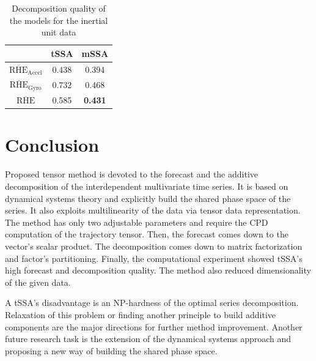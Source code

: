 \documentclass[referee, pdflatex, sn-mathphys-num]{sn-jnl}
\theoremstyle{definition}
\theoremstyle{plain}
\begin{document}
	\def\arraystretch{1.2}
	\begin{table}[h!]
		\centering
		\caption{Decomposition quality of the models for the inertial unit data}\label{tab:decomp_motion_results}
		\begin{tabular}{|c|c|c|}
			\hline
			& tSSA  & mSSA           \\ \hline
			$ \overline{\text{RHE}}_{\text{Accel}} $   & 0.438 & 0.394          \\ \hline
			$ \overline{\text{RHE}}_{\text{Gyro}} $ & 0.732 & 0.468          \\ \hline
			$ \overline{\text{RHE}} $         & 0.585 & \textbf{0.431} \\ \hline
		\end{tabular}
	\end{table}	
	
	\section{Conclusion}
	
		Proposed tensor method is devoted to the forecast and the additive decomposition of the interdependent multivariate time series. It is based on dynamical systems theory and explicitly build the shared phase space of the series. It also exploits multilinearity of the data via tensor data representation. The method has only two adjustable parameters and require the CPD computation of the trajectory tensor. Then, the forecast comes down to the vector's scalar product. The decomposition comes down to matrix factorization and factor's partitioning. Finally, the computational experiment showed tSSA's high forecast and decomposition quality. The method also reduced dimensionality of the given data.
		
		A tSSA's disadvantage is an NP-hardness of the optimal series decomposition. Relaxation of this problem or finding another principle to build additive components are the major directions for further method improvement. Another future research task is the extension of the dynamical systems approach and proposing a new way of building the shared phase space. 
		
		
	
 
\end{document}
